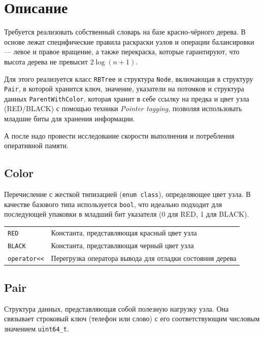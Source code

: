 \section{Описание}

Требуется реализовать собственный словарь на базе красно-чёрного дерева. В основе лежат специфические правила раскраски узлов и операции балансировки — левое и правое вращение, а также перекраска, которые гарантируют, что высота дерева не превысит $2 \log (n + 1)$. 

Для этого реализуется класс \texttt{RBTree} и структура \texttt{Node}, включающая в структуру \texttt{Pair}, в которой хранится ключ, значение, указатели на потомков и структура данных \texttt{ParentWithColor}, которая хранит в себе ссылку на предка и цвет узла (RED/BLACK) с помощью техники \textit{Pointer tagging}, позволяя использовать младшие биты для хранения информации.

А после надо провести исследование скорости выполнения и потребления оперативной памяти.
\pagebreak

\subsection{Color}

Перечисление с жесткой типизацией (\texttt{enum class}), определяющее цвет узла. В качестве базового типа используется \texttt{bool}, что идеально подходит для последующей упаковки в младший бит указателя (0 для RED, 1 для BLACK).

\begin{table}[!ht]
\centering
\begin{tabular}{|p{7.5cm}|p{7.5cm}|}
\hline
\rowcolor{lightgray}
\multicolumn{2}{|c|}{Color} \\
\hline
\texttt{RED} & Константа, представляющая красный цвет узла \\
\hline
\texttt{BLACK} & Константа, представляющая черный цвет узла \\
\hline
\texttt{operator<<} & Перегрузка оператора вывода для отладки состояния дерева \\
\hline
\end{tabular}
\end{table}

\subsection{Pair}

Структура данных, представляющая собой полезную нагрузку узла. Она связывает строковый ключ (телефон или слово) с его соответствующим числовым значением \texttt{uint64\_t}.

